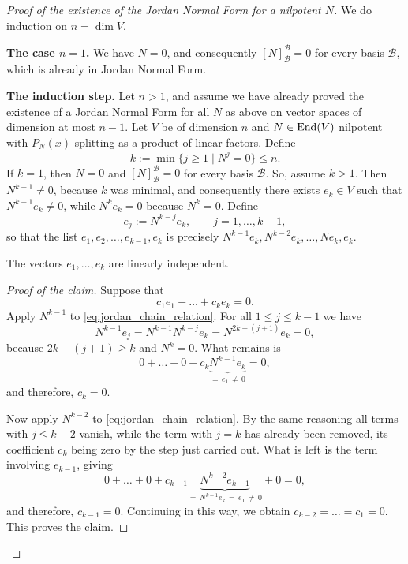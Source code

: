 \begin{proof}[Proof of the existence of the Jordan Normal Form for a nilpotent $N$]
We do induction on $n = \dim V$.

\textbf{The case $n = 1$.} We have $N = 0$, and consequently $[N]_{\mathcal{B}}^{\mathcal{B}} = 0$ for every basis $\mathcal{B}$, which is already in Jordan Normal Form.

\textbf{The induction step.} Let $n > 1$, and assume we have already proved the existence of a Jordan Normal Form for all $N$ as above on vector spaces of dimension at most $n-1$. Let $V$ be of dimension $n$ and $N \in \operatorname{End}(V)$ nilpotent with $P_N(x)$ splitting as a product of linear factors. Define
\[
    k := \min\{ j \ge 1 \mid N^j = 0 \} \le n.
\]
If $k = 1$, then $N = 0$ and $[N]_{\mathcal{B}}^{\mathcal{B}} = 0$ for every basis $\mathcal{B}$. So, assume $k > 1$. Then $N^{k-1} \neq 0$, because $k$ was minimal, and consequently there exists $e_k \in V$ such that $N^{k-1} e_k \neq 0$, while $N^k e_k = 0$ because $N^k = 0$. Define
\[
    e_j := N^{k-j} e_k, \qquad j = 1, \dots, k-1,
\]
so that the list $e_1, e_2, \dots, e_{k-1}, e_k$ is precisely $N^{k-1}e_k, N^{k-2}e_k, \dots, Ne_k, e_k$.

\begin{claim*}
\label{claim:jordan_chain_independent}
The vectors $e_1, \dots, e_k$ are linearly independent.
\end{claim*}

\begin{proof}[Proof of the claim]
Suppose that
\begin{equation}
\label{eq:jordan_chain_relation}
    c_1 e_1 + \dots + c_k e_k = 0.
\end{equation}
Apply $N^{k-1}$ to \eqref{eq:jordan_chain_relation}. For all $1 \le j \le k-1$ we have
\[
    N^{k-1} e_j = N^{k-1} N^{k-j} e_k = N^{2k - (j+1)} e_k = 0,
\]
because $2k - (j+1) \ge k$ and $N^k = 0$. What remains is
\[
    0 + \dots + 0 + c_k \underbrace{N^{k-1} e_k}_{= \, e_1 \, \neq \, 0} = 0,
\]
and therefore, $c_k = 0$.

Now apply $N^{k-2}$ to \eqref{eq:jordan_chain_relation}. By the same reasoning all terms with $j \le k-2$ vanish, while the term with $j = k$ has already been removed, its coefficient $c_k$ being zero by the step just carried out. What is left is the term involving $e_{k-1}$, giving
\[
    0 + \dots + 0 + c_{k-1} \underbrace{N^{k-2} e_{k-1}}_{= \, N^{k-1}e_k \, = \, e_1 \, \neq \, 0} + 0 = 0,
\]
and therefore, $c_{k-1} = 0$. Continuing in this way, we obtain $c_{k-2} = \dots = c_1 = 0$. This proves the claim.
\end{proof}


\end{proof}
